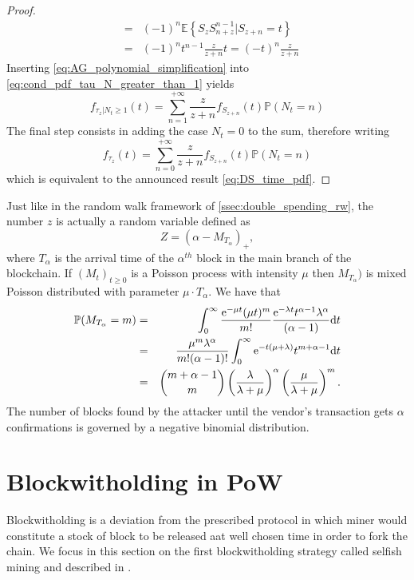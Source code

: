 \begin{proof}
\begin{eqnarray}
&=& (-1)^n\mathbb{E}\left\{S_z S_{n+z}^{n-1} \rvert S_{z+n}=t\right\} \nonumber\\
&=& (-1)^nt^{n-1}\frac{z}{z+n}t =(-t)^n\frac{z}{z+n} \label{eq:AG_polynomial_simplification}
\end{eqnarray}
Inserting \eqref{eq:AG_polynomial_simplification} into \eqref{eq:cond_pdf_tau_N_greater_than_1} yields
\begin{equation*}
f_{\tau_z|N_t\geq1}(t)=\sum_{n=1}^{+\infty}\frac{z}{z+n}f_{S_{z+n}}(t)\mathbb{P}(N_t=n)
\end{equation*}
The final step consists in adding the case $N_t=0$ to the sum, therefore writing
\begin{equation*}
f_{\tau_z}(t)=\sum_{n=0}^{+\infty}\frac{z}{z+n}f_{S_{z+n}}(t)\mathbb{P}(N_t=n)
\end{equation*}
which is equivalent to the announced result \eqref{eq:DS_time_pdf}.  
\end{proof}
\begin{remark}
Just like in the random walk framework of \cref{ssec:double_spending_rw}, the number $z$ is actually a random variable defined as 
$$
Z = (\alpha - M_{T_\alpha})_+,
$$
where $T_\alpha$ is the arrival time of the $\alpha^{th}$ block in the main branch of the blockchain. If $(M_t)_{t\geq0}$ is a Poisson process with intensity $\mu$ then $M_{T_\alpha})$ is mixed Poisson distributed with parameter $\mu\cdot T_{\alpha}$. We have that 
\begin{eqnarray*}
\mathbb{P}(M_{T_\alpha} = m) &=& \int_{0}^{\infty}\frac{\mathrm{e}^{-\mu t}(\mu t)^m}{m!}\frac{\mathrm{e}^{-\lambda t}t^{\alpha-1}\lambda ^\alpha}{(\alpha -1)}\text{d}t\\
&=&\frac{\mu^m\lambda^{\alpha}}{m!(\alpha-1)!}\int_{0}^{\infty}\mathrm{e}^{-t(\mu + \lambda)}t^{m+\alpha-1}\text{d}t\\
&=&\binom{m+\alpha-1}{m}\left(\frac{\lambda}{\lambda+\mu}\right)^{\alpha}\left(\frac{\mu}{\lambda+\mu}\right)^{m}.
\end{eqnarray*}
The number of blocks found by the attacker until the vendor's transaction gets $\alpha$ confirmations is governed by a negative binomial distribution.
\end{remark}
\section{Blockwitholding in PoW}\label{sec:blockwithholding}
Blockwitholding is a deviation from the prescribed protocol in which miner would constitute a stock of block to be released aat well chosen time in order to fork the chain. We focus in this section on the first blockwitholding strategy called selfish mining and described in \citet{Eyal2014}.
